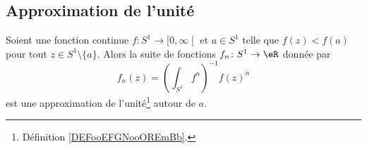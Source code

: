 \subsection{Approximation de l'unité}

\begin{lemma}       \label{LEMooUNFBooRCzwIn}
    Soient une fonction continue \( f\colon S^1\to \mathopen[ 0 , \infty \mathclose[\) et \( a\in S^1\) telle que \( f(z)<f(a)\) pour tout \( z\in S^1\setminus\{ a \}\). Alors la suite de fonctions \( f_n\colon S^1\to \eR\) donnée par
    \begin{equation}        \label{EQooTQYPooLZprJj}
        f_n(z)=\left( \int_{S^1}f^n \right)^{-1}f(z)^n
    \end{equation}
    est une approximation de l'unité\footnote{Définition \ref{DEFooEFGNooOREmBb}.} autour de \( a\).
\end{lemma}

